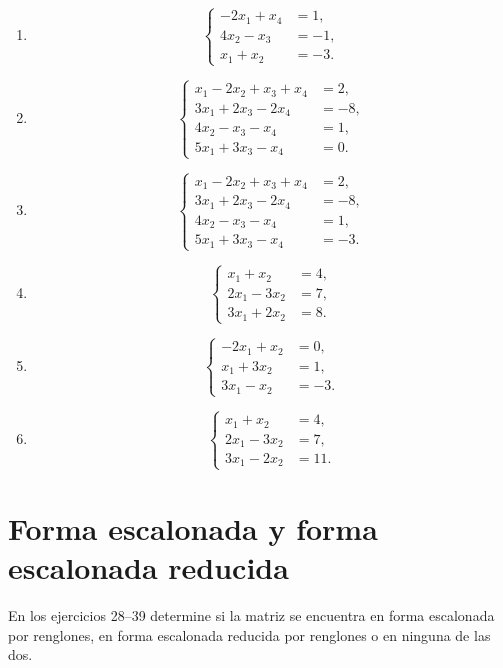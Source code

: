 \documentclass[12pt]{article}
\theoremstyle{remark}
\newcommand{\sistema}[1]{%
\[
\left\{
\begin{aligned}
#1
\end{aligned}
\right.
\]
}
\begin{document}
\begin{enumerate}[label=\textbf{\arabic*.},leftmargin=*]
\item \sistema{
-2x_1+x_4&=1,\\
4x_2-x_3&=-1,\\
x_1+x_2&=-3.
}

\item \sistema{
x_1-2x_2+x_3+x_4&=2,\\
3x_1+2x_3-2x_4&=-8,\\
4x_2-x_3-x_4&=1,\\
5x_1+3x_3-x_4&=0.
}

\item \sistema{
x_1-2x_2+x_3+x_4&=2,\\
3x_1+2x_3-2x_4&=-8,\\
4x_2-x_3-x_4&=1,\\
5x_1+3x_3-x_4&=-3.
}

\item \sistema{
x_1+x_2&=4,\\
2x_1-3x_2&=7,\\
3x_1+2x_2&=8.
}

\item \sistema{
-2x_1+x_2&=0,\\
x_1+3x_2&=1,\\
3x_1-x_2&=-3.
}

\item \sistema{
x_1+x_2&=4,\\
2x_1-3x_2&=7,\\
3x_1-2x_2&=11.
}

\end{enumerate}

\section{Forma escalonada y forma escalonada reducida}

En los ejercicios 28--39 determine si la matriz se encuentra en forma escalonada por
renglones, en forma escalonada reducida por renglones o en ninguna de las dos.
\end{document}
